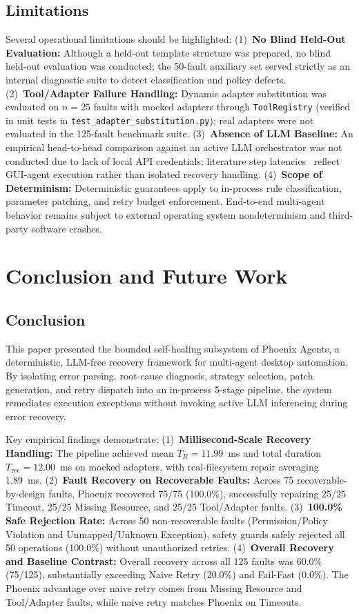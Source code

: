 \documentclass[conference]{IEEEtran}
\begin{document}
\subsection{Limitations}
Several operational limitations should be highlighted:
(1)~\textbf{No Blind Held-Out Evaluation:} Although a held-out template structure was prepared, no blind held-out evaluation was conducted; the 50-fault auxiliary set served strictly as an internal diagnostic suite to detect classification and policy defects.
(2)~\textbf{Tool/Adapter Failure Handling:} Dynamic adapter substitution was evaluated on $n=25$ faults with mocked adapters through \texttt{ToolRegistry} (verified in unit tests in \texttt{test\_adapter\_substitution.py}); real adapters were not evaluated in the 125-fault benchmark suite.
(3)~\textbf{Absence of LLM Baseline:} An empirical head-to-head comparison against an active LLM orchestrator was not conducted due to lack of local API credentials; literature step latencies~\cite{wu2025} reflect GUI-agent execution rather than isolated recovery handling.
(4)~\textbf{Scope of Determinism:} Deterministic guarantees apply to in-process rule classification, parameter patching, and retry budget enforcement. End-to-end multi-agent behavior remains subject to external operating system nondeterminism and third-party software crashes.

\section{Conclusion and Future Work}

\subsection{Conclusion}
This paper presented the bounded self-healing subsystem of Phoenix Agents, a deterministic, LLM-free recovery framework for multi-agent desktop automation. By isolating error parsing, root-cause diagnosis, strategy selection, patch generation, and retry dispatch into an in-process 5-stage pipeline, the system remediates execution exceptions without invoking active LLM inferencing during error recovery.

Key empirical findings demonstrate:
(1)~\textbf{Millisecond-Scale Recovery Handling:} The pipeline achieved mean $T_R = 11.99$~ms and total duration $T_{\text{rec}} = 12.00$~ms on mocked adapters, with real-filesystem repair averaging 1.89~ms.
(2)~\textbf{Fault Recovery on Recoverable Faults:} Across 75 recoverable-by-design faults, Phoenix recovered 75/75 (100.0\%), successfully repairing 25/25 Timeout, 25/25 Missing Resource, and 25/25 Tool/Adapter faults.
(3)~\textbf{100.0\% Safe Rejection Rate:} Across 50 non-recoverable faults (Permission/Policy Violation and Unmapped/Unknown Exception), safety guards safely rejected all 50 operations (100.0\%) without unauthorized retries.
(4)~\textbf{Overall Recovery and Baseline Contrast:} Overall recovery across all 125 faults was 60.0\% (75/125), substantially exceeding Naive Retry (20.0\%) and Fail-Fast (0.0\%). The Phoenix advantage over naive retry comes from Missing Resource and Tool/Adapter faults, while naive retry matches Phoenix on Timeouts.
\end{document}
